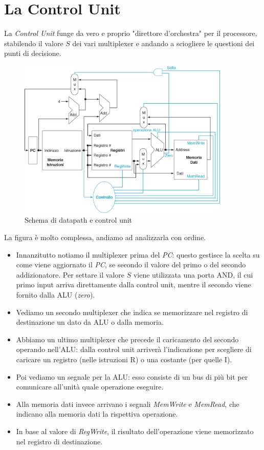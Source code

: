 \documentclass[class=book, crop=false, oneside]{standalone}
\begin{document}
\section{La Control Unit}
La \emph{Control Unit} funge da vero e proprio "direttore d'orchestra" per il processore, stabilendo il valore \(S\) dei vari multiplexer e andando a sciogliere le questioni dei punti di decisione.
\begin{figure}[H]
	\centering
	\includegraphics[width=0.9\textwidth,keepaspectratio]{datap_2}
	\caption{Schema di datapath e control unit}
\end{figure}
La figura è molto complessa, andiamo ad analizzarla con ordine.
\begin{itemize}
	\item Innanzitutto notiamo il multiplexer prima del \emph{PC}: questo gestisce la scelta su come viene aggiornato il \emph{PC}, se secondo il valore del primo o del secondo addizionatore. Per settare il valore \(S\) viene utilizzata una porta AND, il cui primo input arriva direttamente dalla control unit, mentre il secondo viene fornito dalla ALU (\emph{zero}).
	\item Vediamo un secondo multiplexer che indica se memorizzare nel registro di destinazione un dato da ALU o dalla memoria.
	\item Abbiamo un  ultimo multiplexer che precede il caricamento del secondo operando nell'ALU: dalla control unit arriverà l'indicazione per scegliere di caricare un registro (nelle istruzioni R) o una costante (per quelle I).
	\item Poi vediamo un segnale per la ALU: esso consiste di un bus di più bit per comunicare all'unità quale operazione eseguire.
	\item Alla memoria dati invece arrivano i segnali \emph{MemWrite} e \emph{MemRead}, che indicano alla memoria dati  la rispettiva operazione.
	\item In base al valore di \emph{RegWrite}, il risultato dell'operazione viene memorizzato nel registro di destinazione.
\end{itemize}
\end{document}
